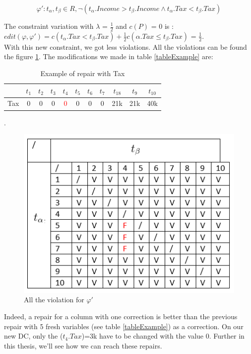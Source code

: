 \documentclass[letterpaper, 12pt]{report}
\theoremstyle{definition}
\begin{document}
$$ \varphi ' : t_\alpha,t_\beta \in R, \neg(t_\alpha.Income > t_\beta.Income \wedge t_\alpha.Tax < t_\beta.Tax)$$

The constraint variation with $\lambda$ = $\frac{1}{2}$ and $c(P)$ = 0 is : $edit(\varphi, \varphi') = c(t_\alpha.Tax < t_\beta.Tax) + \frac{1}{2} c(\alpha.Tax \leq t_\beta.Tax)$ = $\frac{1}{2}$. \\

With this new constraint, we got less violations. All the violations can be found the figure \ref{GoodTax}. The modifications we made in table \ref{tableExample} are:

\begin{table}[H]
	\centering
	\begin{tabular}{|c|c c c c c c c c c c|}
	\hline
	   & $t_1$ & $t_2$ & $t_3$ &$t_4$ &$t_5$ &$t_6$ &$t_7$ &$t_18$ &$t_9$ &$t_10$ \\
	\hline
	 Tax & 0 & 0 & 0 & \textcolor{red}{0} & 0 & 0 & 0 & 21k & 21k & 40k\\
	 \hline
	\end{tabular}
	\caption{\label{tableExample2} Example of repair with Tax}.
\end{table}


\begin{figure}
	\centering
	\includegraphics[scale=1]{img/TaxGood}
	\caption{\label{GoodTax} All the violation for $\varphi '$}
\end{figure}

Indeed, a repair for a column with one correction is better than the previous repair with 5 fresh variables (see table \ref{tableExample}) as a correction. On our new DC, only the ($t_4.Tax$)=3k have to be changed with the value 0. Further in this thesis, we'll see how we can reach these repairs.
\end{document}
